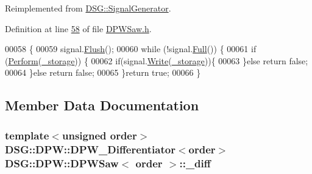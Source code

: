 Reimplemented from \hyperlink{class_d_s_g_1_1_signal_generator_ab050f80e84e6c8b3e354b56930d6a02b}{D\+S\+G\+::\+Signal\+Generator}.



Definition at line \hyperlink{_d_p_w_saw_8h_source_l00058}{58} of file \hyperlink{_d_p_w_saw_8h_source}{D\+P\+W\+Saw.\+h}.


\begin{DoxyCode}
00058                                                               \{
00059                 signal.\hyperlink{class_d_s_g_1_1_ring_buffer_ab23c8003d2857809a816068eeb209d60}{Flush}();
00060                 \textcolor{keywordflow}{while} (!signal.\hyperlink{class_d_s_g_1_1_ring_buffer_a53ddb04ffcbb5470a8d2b0a3c65b70cb}{Full}()) \{
00061                     \textcolor{keywordflow}{if} (\hyperlink{class_d_s_g_1_1_d_p_w_1_1_d_p_w_saw_a8d0bffad58e9bce19fe737302de749ed}{Perform}(\hyperlink{class_d_s_g_1_1_signal_generator_a28a9b47a1aa0783029f11a19ba0363f2}{\_storage})) \{
00062                         \textcolor{keywordflow}{if}(signal.\hyperlink{class_d_s_g_1_1_ring_buffer_aa5dd2caa0a270173251faee40a43d692}{Write}(\hyperlink{class_d_s_g_1_1_signal_generator_a28a9b47a1aa0783029f11a19ba0363f2}{\_storage}))\{
00063                         \}\textcolor{keywordflow}{else} \textcolor{keywordflow}{return} \textcolor{keyword}{false};
00064                     \}\textcolor{keywordflow}{else} \textcolor{keywordflow}{return} \textcolor{keyword}{false};
00065                 \}\textcolor{keywordflow}{return} \textcolor{keyword}{true};
00066             \}
\end{DoxyCode}


\subsection{Member Data Documentation}
\hypertarget{class_d_s_g_1_1_d_p_w_1_1_d_p_w_saw_af1ded15ce266aa7bd1594de38bba6890}{
\subsubsection[{\+\_\+diff}]{\setlength{\rightskip}{0pt plus 5cm}template$<$unsigned order$>$ {\bf D\+S\+G\+::\+D\+P\+W\+::\+D\+P\+W\+\_\+\+Differentiator}$<$order$>$ {\bf D\+S\+G\+::\+D\+P\+W\+::\+D\+P\+W\+Saw}$<$ order $>$\+::\+\_\+diff\hspace{0.3cm}{\ttfamily [protected]}}}\label{class_d_s_g_1_1_d_p_w_1_1_d_p_w_saw_af1ded15ce266aa7bd1594de38bba6890}



